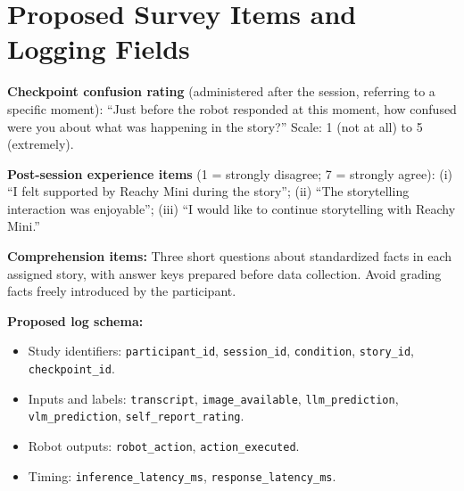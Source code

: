 \documentclass[conference]{IEEEtran}
\begin{document}
\appendix
\section{Proposed Survey Items and Logging Fields}
\noindent\textbf{Checkpoint confusion rating} (administered after the session, referring to a specific moment): ``Just before the robot responded at this moment, how confused were you about what was happening in the story?'' Scale: 1 (not at all) to 5 (extremely).

\noindent\textbf{Post-session experience items} (1 = strongly disagree; 7 = strongly agree): (i) ``I felt supported by Reachy Mini during the story''; (ii) ``The storytelling interaction was enjoyable''; (iii) ``I would like to continue storytelling with Reachy Mini.''

\noindent\textbf{Comprehension items:} Three short questions about standardized facts in each assigned story, with answer keys prepared before data collection. Avoid grading facts freely introduced by the participant.

\noindent\textbf{Proposed log schema:}
\begin{itemize}
\item Study identifiers: \texttt{participant\_id}, \texttt{session\_id}, \texttt{condition}, \texttt{story\_id}, \texttt{checkpoint\_id}.
\item Inputs and labels: \texttt{transcript}, \texttt{image\_available}, \texttt{llm\_prediction}, \texttt{vlm\_prediction}, \texttt{self\_report\_rating}.
\item Robot outputs: \texttt{robot\_action}, \texttt{action\_executed}.
\item Timing: \texttt{inference\_latency\_ms}, \texttt{response\_latency\_ms}.
\end{itemize}
\end{document}
